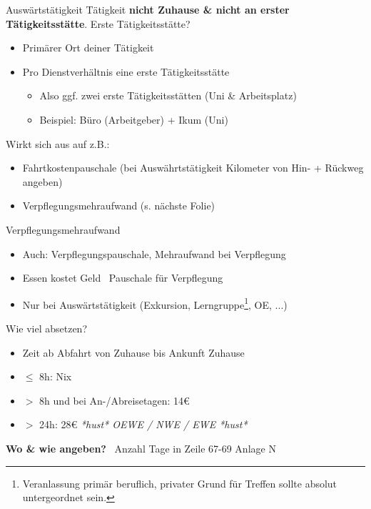 \documentclass{beamer}
\begin{document}
			\begin{frame}{Auswärtstätigkeit}
				Tätigkeit \textbf{nicht Zuhause \& nicht an erster Tätigkeitsstätte}.\n
				Erste Tätigkeitsstätte?
				\begin{itemize}
					\item Primärer Ort deiner Tätigkeit
					\item Pro Dienstverhältnis eine erste Tätigkeitsstätte
					\begin{itemize}
						\item Also ggf. zwei erste Tätigkeitsstätten (Uni \& Arbeitsplatz)
						\item Beispiel: Büro (Arbeitgeber) + Ikum (Uni)
					\end{itemize}
				\end{itemize}\n\pause
				Wirkt sich aus auf z.B.:
				\begin{itemize}
					\item Fahrtkostenpauschale (bei Auswährtstätigkeit Kilometer von Hin- + Rückweg angeben)
					\item Verpflegungsmehraufwand (s. nächste Folie)
				\end{itemize}
			\end{frame}
		
			\begin{frame}[label={verpflegungsmehraufwand}]{Verpflegungsmehraufwand}
				\begin{itemize}
					\item Auch: Verpflegungspauschale, Mehraufwand bei Verpflegung
					\item Essen kostet Geld \textrightarrow\ Pauschale für Verpflegung
					\item Nur bei Auswärtstätigkeit (Exkursion, Lerngruppe\footnote{Veranlassung primär beruflich, privater Grund für Treffen sollte absolut untergeordnet sein.}, OE, ...)
				\end{itemize}\n\pause
				Wie viel absetzen?
				\begin{itemize}
					\item Zeit ab Abfahrt von Zuhause bis Ankunft Zuhause
					\item $\leq$ 8h: Nix
					\item $>$ 8h und bei An-/Abreisetagen: 14€
					\item $>$ 24h: 28€ {\tiny \textit{*hust* OEWE / NWE / EWE *hust*}}
				\end{itemize}\n\pause
				\textbf{Wo \& wie angeben?} \textrightarrow\ Anzahl Tage in Zeile 67-69 Anlage N
			\end{frame}
		
\end{document}
